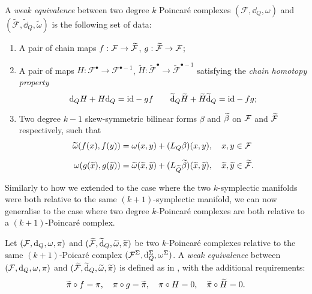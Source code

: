 \begin{definition}
\label{def:weak_eq_Poincaré}
    A \emph{weak equivalence} between two degree $k$ Poincaré complexes $(\mathcal{F}, \dd_Q, \omega)$ and $(\widetilde{\mathcal{F}}, \widetilde{\dd}_Q, \widetilde{\omega})$ is the following set of data:
    \begin{enumerate}[label=\roman*)]
        \item A pair of chain maps $f:\mathcal{F} \rightarrow \widetilde{\mathcal{F}}$, $g:\widetilde{\mathcal{F}} \rightarrow \mathcal{F}$;
        \item A pair of maps $H: \mathcal{F}^\bullet \rightarrow \mathcal{F}^{\bullet -1}$, $\widetilde{H}:\widetilde{\mathcal{F}}^\bullet \rightarrow \widetilde{\mathcal{F}}^{\bullet -1}$ satisfying the \emph{chain homotopy property}
        \begin{equation}
            \dd_Q H + H \dd_Q = \text{id} -gf \qquad \widetilde{\dd}_Q \widetilde{H} + \widetilde{H} \widetilde{\dd}_Q = \text{id} -fg ;
        \end{equation}
        \item Two degree $k-1$ skew-symmetric bilinear forms $\beta$ and $\widetilde{\beta}$ on $\mathcal{F}$ and $\widetilde{\mathcal{F}}$ respectively, such that
        \begin{equation}
            \begin{aligned}
                \widetilde{\omega}(f(x), f(y)) =&
                \; \omega (x, y) +
                (L_Q \beta) (x, y),
                \quad x, y \in \mathcal{F} \\[6pt]
                \omega(g(\widetilde{x}), g(\widetilde{y})) =&
                \; \widetilde{\omega}(\widetilde{x}, \widetilde{y}) +
                (L_{\widetilde{Q}} \widetilde{\beta})(\widetilde{x}, \widetilde{y}),
                \quad \widetilde{x}, \widetilde{y} \in \widetilde{\mathcal{F}}.   
            \end{aligned}
        \end{equation}
    \end{enumerate}
\end{definition}

Similarly to how we extended  to the case where the two $k$-symplectic manifolds were both relative to the same $(k+1)$-symplectic manifold, we can now generalise  to the case where two degree $k$-Poincaré complexes are both relative to a $(k+1)$-Poincaré complex.

\begin{definition}
\label{def:weak_poincaré_relative}
    Let $(\mathcal{F}, \dd_Q, \omega, \pi)$ and $(\widetilde{\mathcal{F}}, \widetilde{\dd}_Q, \widetilde{\omega}, \widetilde{\pi})$ be two $k$-Poincaré complexes relative to the same $(k+1)$-Poicaré complex $(\mathcal{F}^\Sigma, \dd^\Sigma_Q, \omega^\Sigma)$.
    A \emph{weak equivalence} between $(\mathcal{F}, \dd_Q, \omega, \pi)$ and $(\widetilde{\mathcal{F}}, \widetilde{\dd}_Q, \widetilde{\omega}, \widetilde{\pi})$ is defined as in , with the additional requirements:
    \begin{equation*}
        \widetilde{\pi} \circ f = \pi, \quad
        \pi \circ g = \widetilde{\pi}, \quad
        \pi \circ H = 0, \quad
        \widetilde{\pi} \circ \widetilde{H} = 0 .
    \end{equation*}
\end{definition}
